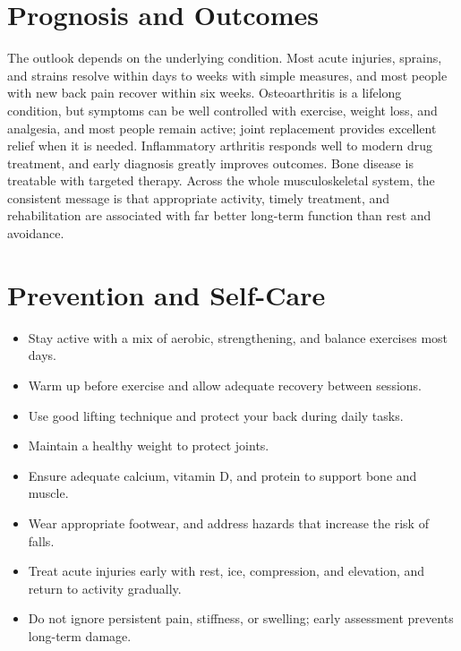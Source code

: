 \section*{Prognosis and Outcomes}
The outlook depends on the underlying condition. Most acute injuries, sprains, and strains resolve within days to weeks with simple measures, and most people with new back pain recover within six weeks. Osteoarthritis is a lifelong condition, but symptoms can be well controlled with exercise, weight loss, and analgesia, and most people remain active; joint replacement provides excellent relief when it is needed. Inflammatory arthritis responds well to modern drug treatment, and early diagnosis greatly improves outcomes. Bone disease is treatable with targeted therapy. Across the whole musculoskeletal system, the consistent message is that appropriate activity, timely treatment, and rehabilitation are associated with far better long-term function than rest and avoidance.

\section*{Prevention and Self-Care}
\begin{itemize}
    \item Stay active with a mix of aerobic, strengthening, and balance exercises most days.
    \item Warm up before exercise and allow adequate recovery between sessions.
    \item Use good lifting technique and protect your back during daily tasks.
    \item Maintain a healthy weight to protect joints.
    \item Ensure adequate calcium, vitamin D, and protein to support bone and muscle.
    \item Wear appropriate footwear, and address hazards that increase the risk of falls.
    \item Treat acute injuries early with rest, ice, compression, and elevation, and return to activity gradually.
    \item Do not ignore persistent pain, stiffness, or swelling; early assessment prevents long-term damage.
\end{itemize}

